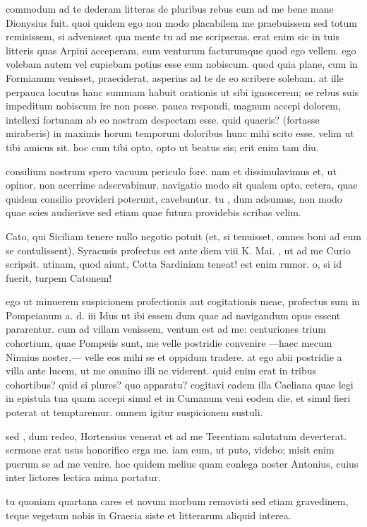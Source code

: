 


 commodum ad te dederam litteras de pluribus rebus cum ad me bene mane Dionysius fuit. quoi quidem ego non modo placabilem me praebuissem sed totum remisissem, si advenisset qua mente tu ad me scripseras. erat enim sic in tuis litteris quas Arpini acceperam, eum venturum facturumque quod ego vellem. ego volebam autem vel cupiebam potius esse eum nobiscum. quod quia plane, cum in Formianum venisset, praeciderat, asperius ad te de eo scribere solebam. at ille perpauca locutus hanc summam habuit orationis ut sibi ignoscerem; se rebus suis impeditum nobiscum ire non posse. pauca respondi, magnum accepi dolorem, intellexi fortunam ab eo nostram despectam esse. quid quaeris? (fortasse miraberis) in maximis horum temporum doloribus hunc mihi scito esse. velim ut tibi amicus sit. hoc cum tibi opto, opto ut beatus sis; erit enim tam diu.

 consilium nostrum spero vacuum periculo fore. nam et dissimulavimus et, ut opinor, non acerrime adservabimur. navigatio modo sit qualem opto, cetera, quae quidem consilio provideri poterunt, cavebuntur. tu , dum adsumus, non modo quae scies audierisve sed etiam quae futura providebis scribas velim.

 Cato, qui Siciliam tenere nullo negotio potuit (et, si tenuisset, omnes boni ad eum se contulissent), Syracusis profectus est ante diem viii K. Mai. , ut ad me Curio scripsit. utinam, quod aiunt, Cotta Sardiniam teneat! est enim rumor. o, si id fuerit, turpem Catonem!

 ego ut minuerem suspicionem profectionis aut cogitationis meae, profectus sum in Pompeianum a. d. iii Idus ut ibi essem dum quae ad navigandum opus essent pararentur. cum ad villam venissem, ventum est ad me: centuriones trium cohortium, quae Pompeiis sunt, me velle postridie convenire —haec mecum Ninnius noster,— velle eos mihi se et oppidum tradere. at ego abii postridie a villa ante lucem, ut me omnino illi ne viderent. quid enim erat in tribus cohortibus? quid si plures? quo apparatu? cogitavi eadem illa Caeliana quae legi in epistula tua quam accepi simul et in Cumanum veni eodem die, et simul fieri poterat ut temptaremur. omnem igitur suspicionem sustuli.

 sed , dum redeo, Hortensius venerat et ad me Terentiam salutatum deverterat. sermone erat usus honorifico erga me. iam eum, ut puto, videbo; misit enim puerum se ad me venire. hoc quidem melius quam conlega noster Antonius, cuius inter lictores lectica mima portatur.

 tu quoniam quartana cares et novum morbum removisti sed etiam gravedinem, teque vegetum nobis in Graecia siste et litterarum aliquid interea.
